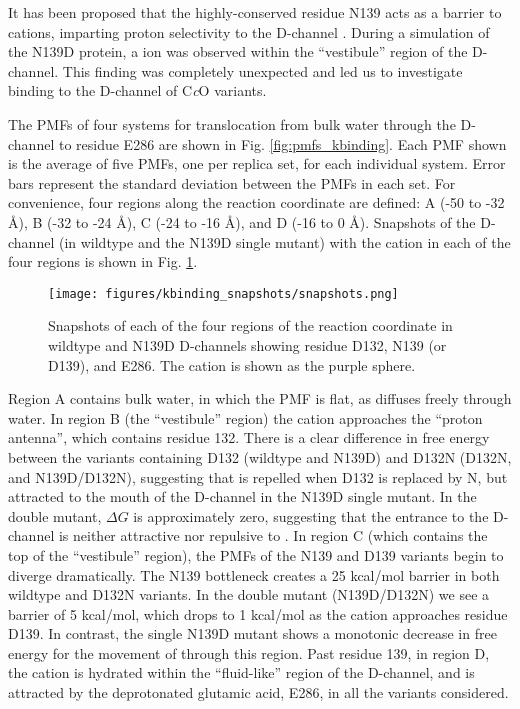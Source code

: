 It has been proposed that the highly-conserved residue N139 acts as a barrier to cations, imparting proton selectivity to the D-channel \cite{Henry:2009p4543}. During a simulation of the N139D protein, a  ion was observed within the ``vestibule'' region of the D-channel. This finding was completely unexpected and led us to investigate  binding to the D-channel of C\emph{c}O variants.

The PMFs of four systems for  translocation from bulk water through the D-channel to residue E286 are shown in Fig. \ref{fig:pmfs_kbinding}. Each PMF shown is the average of five PMFs, one per replica set, for each individual system. Error bars represent the standard deviation between the PMFs in each set. For convenience, four regions along the reaction coordinate are defined: A (-50 to -32 Å), B (-32 to -24 Å), C (-24 to -16 Å), and D (-16 to 0 Å). Snapshots of the D-channel (in wildtype and the N139D single mutant) with the cation in each of the four regions is shown in Fig. \ref{fig:kbinding_snapshots}.

\begin{figure}[htbp]
\centering
\texttt{[image: figures/kbinding\_snapshots/snapshots.png]}
\caption[Snapshots of each of the four regions of the reaction coordinate in wildtype and N139D D-channels showing residues D132, N139 (or D139), and E286.]{Snapshots of each of the four regions of the reaction coordinate in wildtype and N139D D-channels showing residue D132, N139 (or D139), and E286. The  cation is shown as the purple sphere.}
\label{fig:kbinding_snapshots}
\end{figure}

Region A contains bulk water, in which the PMF is flat, as  diffuses freely through water. In region B (the ``vestibule'' region) the cation approaches the ``proton antenna'', which contains residue 132. There is a clear difference in free energy between the variants containing D132 (wildtype and N139D) and D132N (D132N, and N139D/D132N), suggesting that  is repelled when D132 is replaced by N, but attracted to the mouth of the D-channel in the N139D single mutant. In the double mutant, $\Delta G$ is approximately zero, suggesting that the entrance to the D-channel is neither attractive nor repulsive to . In region C (which contains the top of the ``vestibule'' region), the PMFs of the N139 and D139 variants begin to diverge dramatically. The N139 bottleneck creates a 25 kcal/mol barrier in both wildtype and D132N variants. In the double mutant (N139D/D132N) we see a barrier of 5 kcal/mol, which drops to 1 kcal/mol as the cation approaches residue D139. In contrast, the single N139D mutant shows a monotonic decrease in free energy for the movement of  through this region. Past residue 139, in region D, the cation is hydrated within the ``fluid-like'' region of the D-channel, and is attracted by the deprotonated glutamic acid, E286, in all the variants considered.

